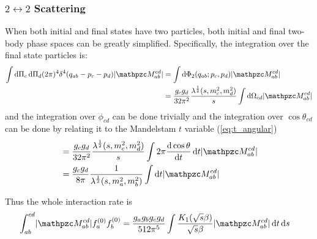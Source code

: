 \documentclass[
  a4paper,             %
  11pt,                %
  oneside,             %
  onecolumn,           %
  bibliography=totoc,  %
  final,               %
]{scrartcl}
\begin{document}
\subsubsection{\texorpdfstring{\(2 \leftrightarrow 2\)}{2 to 2} Scattering}%
\label{sec:2-to-2_scattering}

When both initial and final states have two particles, both initial and final
two-body phase spaces can be greatly simplified.  Specifically, the integration
over the final state particles is:
\begin{equation}
  \begin{aligned}
    \int \dd \Pi_c \dd \Pi_d (2 \pi)^4 \delta^4(q_{ab} - p_c - p_d) \abs{\pzcM_{ab}^{cd}}
    &= \int \dd \Phi_2(q_{ab}; p_c, p_d) \abs{\pzcM_{ab}^{cd}} \\
    &= \frac{g_c g_d}{32 \pi^2} \frac{\lambda^\frac{1}{2}(s, m_c^2, m_d^2)}{s} \int \dd \Omega_{cd} \abs{\pzcM_{ab}^{cd}}
  \end{aligned}
\end{equation}
and the integration over \(\phi_{cd}\) can be done trivially and the
integration over \(\cos \theta_{cd}\) can be done by relating it to the
Mandelstam \(t\) variable (\cref{eq:t_angular})
\begin{equation}
  \begin{aligned}
    &= \frac{g_c g_d}{32 \pi^2} \frac{\lambda^\frac{1}{2}(s, m_c^2, m_d^2)}{s} \int 2 \pi \frac{\dd \cos\theta}{\dd t} \dd t \abs{\pzcM_{ab}^{cd}} \\
    &= \frac{g_c g_d}{8 \pi} \frac{1}{\lambda^\frac{1}{2}(s, m_a^2, m_b^2)} \int \dd t \abs{\pzcM_{ab}^{cd}}
  \end{aligned}
\end{equation}

Thus the whole interaction rate is
\begin{equation}
  \begin{aligned}
    \int_{ab}^{cd} \abs{\pzcM_{ab}^{cd}} f_a^{(0)} f_b^{(0)}
    &= \frac{g_a g_b g_c g_d}{512 \pi^5} \int \frac{K_1(\sqrt s \beta)}{\sqrt s \beta} \abs{\pzcM_{ab}^{cd}} \dd t \dd s
  \end{aligned}
\end{equation}
\end{document}
